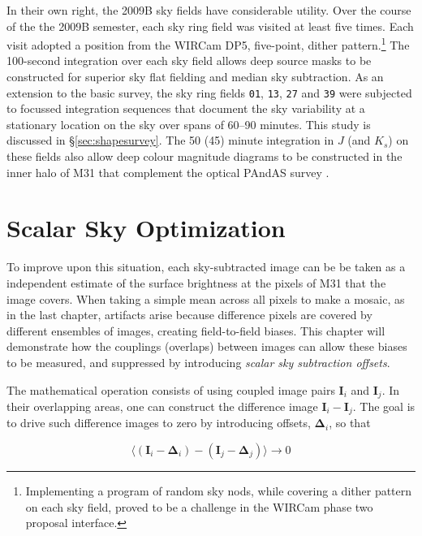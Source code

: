 \documentclass[iop]{emulateapj}
\newcommand{\vect}[1]{\boldsymbol{#1}} %
\begin{document}
In their own right, the 2009B sky fields have considerable utility. Over the course of the the 2009B semester, each sky ring field was visited at least five times. Each visit adopted a position from the WIRCam DP5, five-point, dither pattern.\footnote{Implementing a program of random sky nods, while covering a dither pattern on each sky field, proved to be a challenge in the WIRCam phase two proposal interface.} The 100-second integration over each sky field allows deep source masks to be constructed for superior sky flat fielding and median sky subtraction. As an extension to the basic survey, the sky ring fields \texttt{01}, \texttt{13}, \texttt{27} and \texttt{39} were subjected to focussed integration sequences that document the sky variability at a stationary location on the sky over spans of 60--90 minutes. This study is discussed in \S \ref{sec:shapesurvey}. The 50 (45) minute integration in $J$ (and $K_s$) on these fields also allow deep colour magnitude diagrams to be constructed in the inner halo of M31 that complement the optical PAndAS survey \cite{Ibata:2007}.



\section{Scalar Sky Optimization} %
\label{sec:scalarsky}

To improve upon this situation, each sky-subtracted image can be be taken as a independent estimate of the surface brightness at the pixels of M31 that the image covers. When taking a simple mean across all pixels to make a mosaic, as in the last chapter, artifacts arise because difference pixels are covered by different ensembles of images, creating field-to-field biases. This chapter will demonstrate how the couplings (overlaps) between images can allow these biases to be measured, and suppressed by introducing \emph{scalar sky subtraction offsets}.

The mathematical operation consists of using coupled image pairs $\vect{I}_i$ and $\vect{I}_j$. In their overlapping areas, one can construct the difference image $\vect{I}_i - \vect{I}_j$.
The goal is to drive such difference images to zero by introducing offsets, $\vect{\Delta}_i$, so that

\begin{equation}
    \langle (\vect{I}_i-\vect{\Delta}_i) - (\vect{I}_j-\vect{\Delta}_j) \rangle \rightarrow 0
    \label{eq:offsettheory}
\end{equation}
\end{document}
